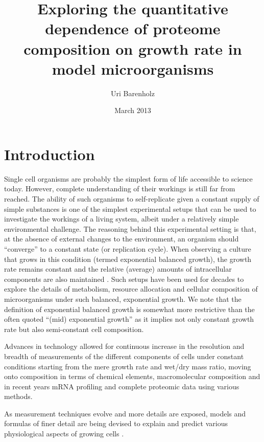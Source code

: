 \documentclass{report}
\title{Exploring the quantitative dependence of proteome composition on growth rate in model microorganisms}
\author{Uri Barenholz}
\date{March 2013}
\begin{document}
\maketitle
\tableofcontents

\section{Introduction}
Single cell organisms are probably the simplest form of life accessible to science today.
However, complete understanding of their workings is still far from reached.
The ability of such organisms to self-replicate given a constant supply of simple substances is one of the simplest experimental setups that can be used to investigate the workings of a living system, albeit under a relatively simple environmental challenge.
The reasoning behind this experimental setting is that, at the absence of external changes to the environment, an organism should “converge” to a constant state (or replication cycle).
When observing a culture that grows in this condition (termed exponential balanced growth), the growth rate remains constant and the relative (average) amounts of intracellular components are also maintained \cite{Campbell1957}.
Such setups have been used for decades \cite{Schaechter1958,Maaloe1969,Pedersen1978a} to explore the details of metabolism, resource allocation and cellular composition of microorganisms under such balanced, exponential growth.
We note that the definition of exponential balanced growth is somewhat more restrictive than the often quoted ``(mid) exponential growth'' as it implies not only constant growth rate but also semi-constant cell composition.

Advances in technology allowed for continuous increase in the resolution and breadth of measurements of the different components of cells under constant conditions starting from the mere growth rate and wet/dry mass ratio, moving onto composition in terms of chemical elements, macromolecular composition and in recent years mRNA profiling and complete proteomic data using various methods.

As measurement techniques evolve and more details are exposed, models and formulas of finer detail are being devised to explain and predict various physiological aspects of growing cells \cite{Scott2010a,Lerman2012,Karr2012}.
\end{document}
